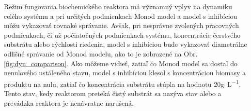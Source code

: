 Režim fungovania biochemického reaktora má významný vplyv na dynamiku celého systému a pri určitých podmienkach Monod model a model s inhibíciou môžu vykazovať rovnaké správanie. Avšak, pri nesprávne zvolených pracovných podmienkach, či už počiatočných podmienkach systému, koncentrácie čerstvého substrátu alebo rýchlosti riedenia, model s inhibíciou bude vykazovať diametrálne odlišné správanie od Monod modelu, ako to je zobrazené na Obr. \ref{fig:dyn_comparison}. Ako môžeme vidieť, zatiaľ čo Monod model sa dostal do nenulového ustáleného stavu, model s inhibíciou klesol s koncentráciou biomasy a produktu na nulu, zatiaľ čo koncentrácia substrátu stúpla na hodnotu 20\si{\gram\per\liter}. Tento stav, kedy reaktorom preteká čistý substrát sa nazýva stav  alebo  a prevádzka reaktora je nenávratne narušená.

